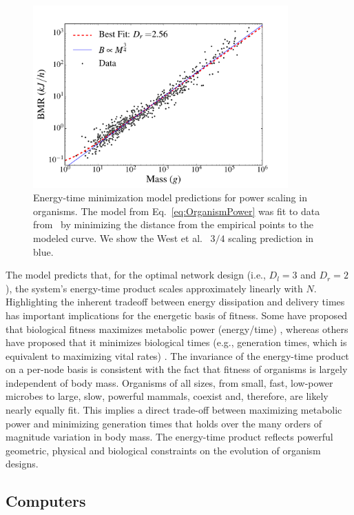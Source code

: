 \documentclass[12pt]{article}
\begin{document}
\begin{figure}[!h] \centering
  \includegraphics[height=70mm]{Figures/OrganismsPowerScaling.pdf}

  \caption{Energy-time minimization model predictions for power
    scaling in organisms. The model from Eq.~\ref{eq:OrganismPower}
    was fit to data from~\cite{kolokotrones2010curvature} by minimizing the distance
    from the empirical points to the modeled curve. We show the West et al.~\cite{west97} $3/4$ scaling prediction in blue.
    }
\label{fig:OrganismsPowerScaling}
\end{figure}


The model predicts that, for the optimal network design (i.e., $D_l=3$  and
$D_r=2$), the system's energy-time product scales approximately linearly with $N$. Highlighting the inherent tradeoff between energy dissipation and delivery times 
has important implications for the energetic basis of fitness.  Some have proposed that biological fitness
maximizes metabolic power (energy/time) \cite{lotka56, odum71}, whereas others
have proposed that it minimizes biological times (e.g., generation times, which
is equivalent to maximizing vital rates) \cite{lindstedt81, sibly91}. The
invariance of the energy-time product on a per-node basis is consistent with the fact that fitness
of organisms is largely independent of body mass.  Organisms of all sizes, from
small, fast, low-power microbes to large, slow, powerful mammals, coexist and,
therefore, are likely nearly equally fit.  This implies a direct trade-off
between maximizing metabolic power and minimizing generation times that holds
over the many orders of magnitude variation in body mass.  The energy-time
product reflects powerful geometric, physical and biological constraints on the
evolution of organism designs.


\subsection{Computers}
\label{sec:computers}
\end{document}
